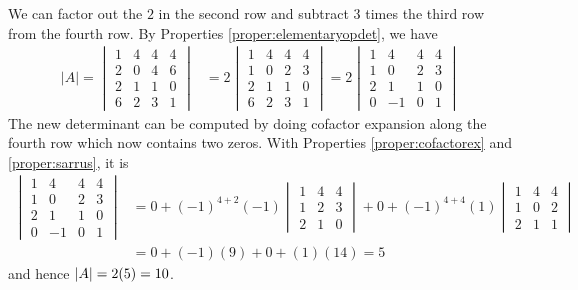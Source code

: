 \begin{solution}
We can factor out the $2$ in the second row and subtract $3$ times the third row from the fourth row. By Properties \ref{proper:elementaryopdet}, we have
\begin{align*}
|A| = 
\begin{vmatrix}
1 & 4 & 4 & 4 \\
2 & 0 & 4 & 6 \\
2 & 1 & 1 & 0 \\
6 & 2 & 3 & 1
\end{vmatrix}
&=
2
\begin{vmatrix}
1 & 4 & 4 & 4 \\
1 & 0 & 2 & 3 \\
2 & 1 & 1 & 0 \\
6 & 2 & 3 & 1
\end{vmatrix} = 
2
\begin{vmatrix}
1 & 4 & 4 & 4 \\
1 & 0 & 2 & 3 \\
2 & 1 & 1 & 0 \\
0 & -1 & 0 & 1
\end{vmatrix} 
\end{align*}
The new determinant can be computed by doing cofactor expansion along the fourth row which now contains two zeros. With Properties \ref{proper:cofactorex} and \ref{proper:sarrus}, it is
\begin{align*}
\begin{vmatrix}
1 & 4 & 4 & 4 \\
1 & 0 & 2 & 3 \\
2 & 1 & 1 & 0 \\
0 & -1 & 0 & 1
\end{vmatrix}
&= 0 + (-1)^{4+2}(-1)
\begin{vmatrix}
1 & 4 & 4 \\
1 & 2 & 3 \\
2 & 1 & 0 
\end{vmatrix} 
+ 0 + (-1)^{4+4}(1)
\begin{vmatrix}
1 & 4 & 4 \\
1 & 0 & 2 \\
2 & 1 & 1 
\end{vmatrix} \\
&= 0 + (-1)(9) + 0 + (1)(14) = 5
\end{align*}
and hence $\abs{A} = 2(5) = 10$.
\end{solution}

